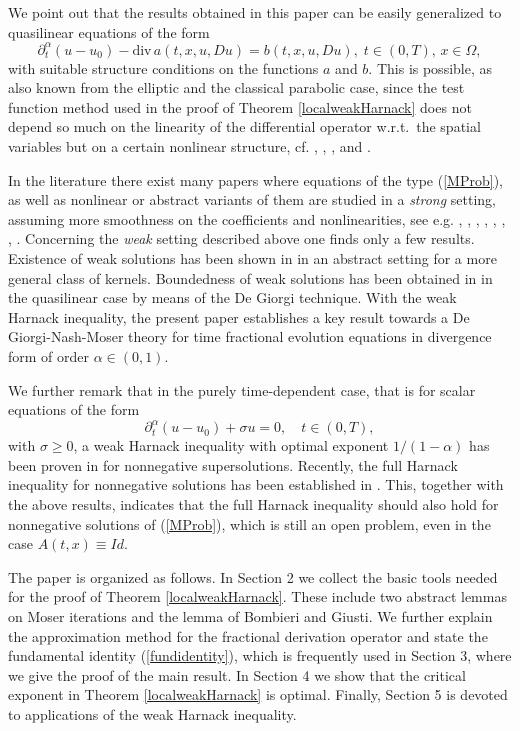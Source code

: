 \documentclass[10pt]{article}
\begin{document}
We point out that the results obtained in this paper can be easily
generalized to quasilinear equations of the form
\begin{equation} \label{QProb}
\partial_t^\alpha (u-u_0)-\mbox{div}\,a(t,x,u,Du)=b(t,x,u,Du),\;t\in (0,T),\,x\in \Omega,
\end{equation}
with suitable structure conditions on the functions $a$ and $b$.
This is possible, as also known from the elliptic and the classical
parabolic case, since the test function method used in the proof of
Theorem \ref{localweakHarnack} does not depend so much on the
linearity of the differential operator w.r.t.\ the spatial variables
but on a certain nonlinear structure, cf. \cite{GilTrud}, \cite{Lm},
\cite{Trud}, and \cite{Za2}.

In the literature there exist many papers where equations of the
type (\ref{MProb}), as well as nonlinear or abstract variants of
them are studied in a {\em strong} setting, assuming more smoothness
on the coefficients and nonlinearities, see e.g. \cite{Ba},
\cite{CLS}, \cite{CP2}, \cite{Koch}, \cite{Grip1}, \cite{JanI},
\cite{ZEQ}, \cite{ZQ}. Concerning the {\em weak} setting described
above one finds only a few results. Existence of weak solutions has
been shown in \cite{ZWH} in an abstract setting for a more general
class of kernels. Boundedness of weak solutions has been obtained in
\cite{Za2} in the quasilinear case by means of the De Giorgi
technique. With the weak Harnack inequality, the present paper
establishes a key result towards a De Giorgi-Nash-Moser theory for
time fractional evolution equations in divergence form of order
$\alpha\in(0,1)$.

We further remark that in the purely time-dependent case, that is
for scalar equations of the form
\[
\partial_t^\alpha (u-u_0)+\sigma u=0,\quad t\in (0,T),
\]
with $\sigma\ge 0$, a weak Harnack inequality with optimal exponent
$1/(1-\alpha)$ has been proven in \cite{Za} for nonnegative
supersolutions. Recently, the full Harnack inequality for
nonnegative solutions has been established in \cite{Za3}. This,
together with the above results, indicates that the full Harnack
inequality should also hold for nonnegative solutions of
(\ref{MProb}), which is still an open problem, even in the case
$A(t,x)\equiv Id$.

The paper is organized as follows. In Section 2 we collect the basic
tools needed for the proof of Theorem \ref{localweakHarnack}. These
include two abstract lemmas on Moser iterations and the lemma of
Bombieri and Giusti. We further explain the approximation method for
the fractional derivation operator and state the fundamental
identity (\ref{fundidentity}), which is frequently used in Section
3, where we give the proof of the main result. In Section 4 we show
that the critical exponent in Theorem \ref{localweakHarnack} is
optimal. Finally, Section 5 is devoted to applications of the weak
Harnack inequality.
\end{document}
